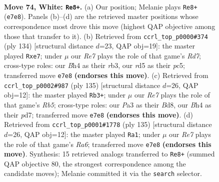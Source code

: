 \documentclass[11pt]{article}
\begin{document}
\clearpage

\begin{figure}[p]\centering
\begin{subfigure}{0.46\textwidth}\centering
\resizebox{\linewidth}{!}{%
\newchessgame
\chessboard[
  setfen={6k1/3nR3/8/3r4/p4P1B/P6P/8/5K2 w - - 3 74},
  showmover=false,
  pgfstyle=straightmove, color=movearrow, markmove={e7-e8}
]}
\caption{}
\end{subfigure}\hfill
\begin{subfigure}{0.46\textwidth}\centering
\resizebox{\linewidth}{!}{%
\newchessgame
\chessboard[
  setfen={8/3Rn3/6k1/2p5/P1P5/1r2pP2/6K1/8 w - - 0 68},
  showmover=false,
  pgfstyle=straightmove, color=movearrow, markmove={d7-e7}
]}
\caption{}
\end{subfigure}
\\[4pt]
\begin{subfigure}{0.46\textwidth}\centering
\resizebox{\linewidth}{!}{%
\newchessgame
\chessboard[
  setfen={3b4/3P1pk1/2B5/7p/1r6/7K/1NR5/8 b - - 5 68},
  showmover=false,
  pgfstyle=straightmove, color=movearrow, markmove={b4-b3}
]}
\caption{}
\end{subfigure}\hfill
\begin{subfigure}{0.46\textwidth}\centering
\resizebox{\linewidth}{!}{%
\newchessgame
\chessboard[
  setfen={8/p4k2/2R5/8/7p/r1N5/5K2/8 b - - 13 68},
  showmover=false,
  pgfstyle=straightmove, color=movearrow, markmove={a3-a1}
]}
\caption{}
\end{subfigure}
\caption{\textbf{Move 74, White: \texttt{Re8+}.} (a) Our position; Melanie plays \texttt{Re8+} (\texttt{e7e8}). Panels (b)--(d) are the retrieved master positions whose correspondence most drove this move (highest QAP objective among those that transfer to it). (b) Retrieved from \texttt{ccrl\_top\_p0000\#374} (ply 134) [structural distance $d$=23, QAP obj=19]: the master played \texttt{Rxe7}; under $\mu$ our \emph{Re7} plays the role of that game's \emph{Rd7}; cross-type roles: our \emph{B}h4 as their \emph{r}b3, our \emph{r}d5 as their \emph{p}c5; transferred move \texttt{e7e8} \textbf{(endorses this move)}. (c) Retrieved from \texttt{ccrl\_top\_p0002\#987} (ply 135) [structural distance $d$=26, QAP obj=12]: the master played \texttt{Rb3+}; under $\mu$ our \emph{Re7} plays the role of that game's \emph{Rb5}; cross-type roles: our \emph{P}a3 as their \emph{B}d8, our \emph{B}h4 as their \emph{p}d7; transferred move \texttt{e7e8} \textbf{(endorses this move)}. (d) Retrieved from \texttt{ccrl\_top\_p0001\#1778} (ply 135) [structural distance $d$=26, QAP obj=12]: the master played \texttt{Ra1}; under $\mu$ our \emph{Re7} plays the role of that game's \emph{Ra6}; transferred move \texttt{e7e8} \textbf{(endorses this move)}. Synthesis: 15 retrieved analogs transferred to \texttt{Re8+} (summed QAP objective 80, the strongest correspondence among the candidate moves); Melanie committed it via the \texttt{search} selector.}
\label{fig:thought-m146}
\end{figure}
\end{document}
